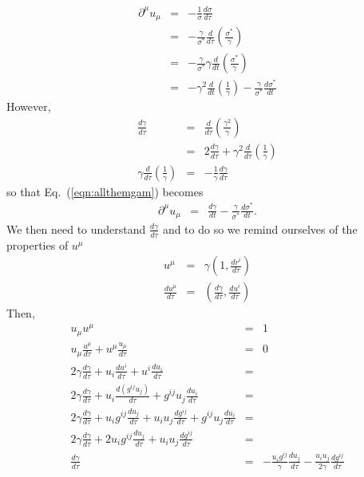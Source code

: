 \documentclass[aps,article]{revtex4}
\begin{document}
\begin{eqnarray}
\partial^{\mu}u_{\mu}&=&-\frac{1}{\sigma}\frac{d\sigma}{d\tau}\nonumber\\
&=&-\frac{\gamma}{\sigma^*}\frac{d}{d\tau}\left(\frac{\sigma^*}{\gamma}\right)\nonumber\\
&=&-\frac{\gamma}{\sigma^*}\gamma\frac{d}{dt}\left(\frac{\sigma^*}{\gamma}\right)\nonumber\\
&=&-\gamma^2\frac{d}{dt}\left(\frac{1}{\gamma}\right)-\frac{\gamma}{\sigma^*}\frac{d\sigma^*}{dt}\label{eqn:allthemgam}
\end{eqnarray}
However, 
\begin{eqnarray}
\frac{d\gamma}{d\tau} &=&\frac{d}{d\tau} \left(\frac{\gamma^2}{\gamma}\right)\nonumber\\
&=&2\frac{d\gamma}{d\tau}+\gamma^2\frac{d}{d\tau} \left(\frac{1}{\gamma}\right)\nonumber\\
\gamma \frac{d}{d\tau} \left(\frac{1}{\gamma}\right)&=&-\frac{1}{\gamma}\frac{d\gamma}{d\tau}
\end{eqnarray}
so that Eq.\ (\ref{eqn:allthemgam}) becomes
\begin{eqnarray}
\partial^{\mu}u_{\mu}&=&\frac{d\gamma}{dt}-\frac{\gamma}{\sigma^*}\frac{d\sigma^*}{dt}.
\end{eqnarray}
We then need to understand $\frac{d\gamma}{d\tau}$ and to do so we remind ourselves of the properties of $u^{\mu}$
\begin{eqnarray}
u^{\mu}&=&\gamma\left(1,\frac{dr^i}{d\tau}\right)\nonumber\\
\frac{du^{\mu}}{d\tau}&=&\left(\frac{d\gamma}{d\tau},\frac{du^i}{d\tau}\right)
\end{eqnarray}
Then,
\begin{eqnarray}
u_{\mu}u^{\mu}&=&1\nonumber\\
u_{\mu}\frac{u^{\mu}}{d\tau}+u^{\mu}\frac{u_{\mu}}{d\tau}&=&0\nonumber\\
2\gamma \frac{d\gamma}{d\tau}+u_i \frac{du^i}{d\tau}+u^i \frac{du_i}{d\tau}&=&\nonumber\\
2\gamma \frac{d\gamma}{d\tau}+u_i \frac{d(g^{ij}u_j)}{d\tau}+g^{ij}u_j \frac{du_i}{d\tau}&=&\nonumber\\
2\gamma \frac{d\gamma}{d\tau}+u_i g^{ij}\frac{du_j}{d\tau}+u_i u_j\frac{dg^{ij}}{d\tau}+g^{ij}u_j \frac{du_i}{d\tau}&=&\nonumber\\
2\gamma \frac{d\gamma}{d\tau}+2u_i g^{ij}\frac{du_j}{d\tau}+u_i u_j\frac{dg^{ij}}{d\tau}&=&\nonumber\\
 \frac{d\gamma}{d\tau}&=& -\frac{u_i g^{ij}}{\gamma}\frac{du_j}{d\tau}-\frac{u_i u_j}{2\gamma}\frac{dg^{ij}}{d\tau}
\end{eqnarray}
\end{document}
